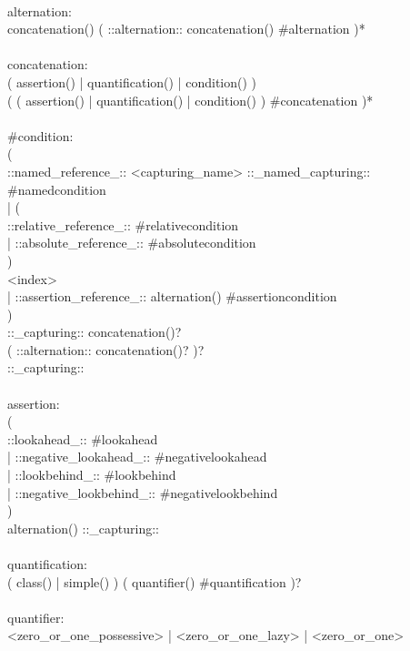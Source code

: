 \begin{bigbigpre}
 \\
alternation: \\
    concatenation() ( ::alternation:: concatenation() #alternation )* \\
 \\
concatenation: \\
    (   assertion() | quantification() | condition() ) \\
    ( ( assertion() | quantification() | condition() ) #concatenation )* \\
 \\
#condition: \\
    ( \\
        ::named_reference_:: <capturing_name> ::_named_capturing:: #namedcondition \\
      | ( \\
            ::relative_reference_:: #relativecondition \\
          | ::absolute_reference_:: #absolutecondition \\
        ) \\
        <index> \\
      | ::assertion_reference_:: alternation() #assertioncondition \\
    ) \\
    ::_capturing:: concatenation()? \\
    ( ::alternation:: concatenation()? )? \\
    ::_capturing:: \\
 \\
assertion: \\
    ( \\
        ::lookahead_::           #lookahead \\
      | ::negative_lookahead_::  #negativelookahead \\
      | ::lookbehind_::          #lookbehind \\
      | ::negative_lookbehind_:: #negativelookbehind \\
    ) \\
    alternation() ::_capturing:: \\
 \\
quantification: \\
    ( class() | simple() ) ( quantifier() #quantification )? \\
 \\
quantifier: \\
    <zero_or_one_possessive>  | <zero_or_one_lazy>  | <zero_or_one> \\

\end{bigbigpre}
